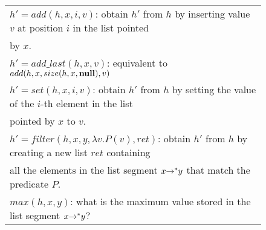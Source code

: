 \documentclass[runningheads,a4paper]{llncs}
\newcommand*{\extended}{}
\begin{document}
\begin{figure*}[!hbt]
{\small
  \begin{tabular}{l}
    $h'=add(h, x, i, v)$:  obtain $h'$ from $h$ by inserting value $v$ at position $i$ in the list pointed\\
    by $x$.\\
$h'=add\_last(h, x, v)$:  equivalent to $add(h, x, size(h, x, \mathbf{null}), v)$\\
    $h'= set(h,x, i, v)$:  obtain $h'$ from $h$ by setting the value of the $i$-th element in the list\\
    pointed by $x$ to $v$.\\
    $h'=filter(h,x,y,\lambda v.P(v),ret)$:  obtain $h'$ from $h$ by creating a new list $ret$
    containing\\ all the elements in the list segment $x {\rightarrow^*} y$ that match the predicate $P$.\\
$max(h,x,y)$: what is the maximum value stored in the list segment $x {\rightarrow^*} y$?\\

\end{tabular}}
\end{figure*}
\end{document}

